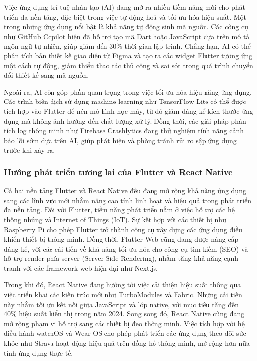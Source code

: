 \indent Việc ứng dụng trí tuệ nhân tạo (AI) đang mở ra nhiều tiềm năng mới cho phát triển đa nền tảng, đặc biệt trong việc tự động hoá và tối ưu hóa hiệu suất. Một trong những ứng dụng nổi bật là khả năng tự động sinh mã nguồn. Các công cụ như GitHub Copilot hiện đã hỗ trợ tạo mã Dart hoặc JavaScript dựa trên mô tả ngôn ngữ tự nhiên, giúp giảm đến 30\% thời gian lập trình. Chẳng hạn, AI có thể phân tích bản thiết kế giao diện từ Figma và tạo ra các widget Flutter tương ứng một cách tự động, giảm thiểu thao tác thủ công và sai sót trong quá trình chuyển đổi thiết kế sang mã nguồn.

\vspace{0.5em}

\indent Ngoài ra, AI còn góp phần quan trọng trong việc tối ưu hóa hiệu năng ứng dụng. Các trình biên dịch sử dụng machine learning như TensorFlow Lite có thể được tích hợp vào Flutter để nén mô hình học máy, từ đó giảm đáng kể kích thước ứng dụng mà không ảnh hưởng đến chất lượng xử lý. Đồng thời, các giải pháp phân tích log thông minh như Firebase Crashlytics đang thử nghiệm tính năng cảnh báo lỗi sớm dựa trên AI, giúp phát hiện và phòng tránh rủi ro sập ứng dụng trước khi xảy ra.

\subsubsection{Hướng phát triển tương lai của Flutter và React Native}

\indent Cả hai nền tảng Flutter và React Native đều đang mở rộng khả năng ứng dụng sang các lĩnh vực mới nhằm nâng cao tính linh hoạt và hiệu quả trong phát triển đa nền tảng. Đối với Flutter, tiềm năng phát triển nằm ở việc hỗ trợ các hệ thống nhúng và Internet of Things (IoT). Sự kết hợp với các thiết bị như Raspberry Pi cho phép Flutter trở thành công cụ xây dựng các ứng dụng điều khiển thiết bị thông minh. Đồng thời, Flutter Web cũng đang được nâng cấp đáng kể, với các cải tiến về khả năng tối ưu hóa cho công cụ tìm kiếm (SEO) và hỗ trợ render phía server (Server-Side Rendering), nhằm tăng khả năng cạnh tranh với các framework web hiện đại như Next.js.

\vspace{0.5em}

\indent Trong khi đó, React Native đang hướng tới việc cải thiện hiệu suất thông qua việc triển khai các kiến trúc mới như TurboModules và Fabric. Những cải tiến này nhằm tối ưu kết nối giữa JavaScript và lớp native, với mục tiêu tăng đến 40\% hiệu suất hiển thị trong năm 2024. Song song đó, React Native cũng đang mở rộng phạm vi hỗ trợ sang các thiết bị đeo thông minh. Việc tích hợp với hệ điều hành watchOS và Wear OS cho phép phát triển các ứng dụng theo dõi sức khỏe như Strava hoạt động hiệu quả trên đồng hồ thông minh, mở rộng hơn nữa tính ứng dụng thực tế.

